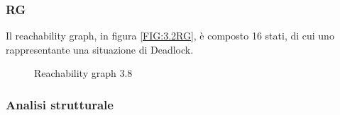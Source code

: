 \documentclass[a4paper]{article}
\begin{document}
\subsubsection{RG}
Il reachability graph, in figura \ref{FIG:3.2RG}, è composto 16 stati, di cui uno rappresentante una situazione di Deadlock.
\begin{figure}[!ht]
\centering
{}
\caption{Reachability graph 3.8} \label{FIG:3.8RG}
\end{figure}
\newpage
\subsubsection{Analisi strutturale}
\end{document}
